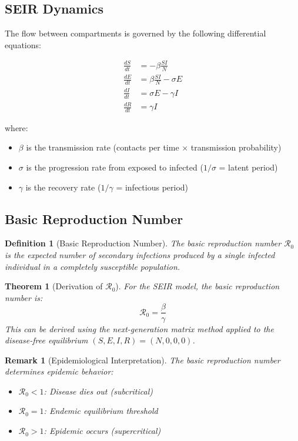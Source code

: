 \documentclass[a4paper, 11pt]{article}
\newtheorem{definition}{Definition}[section]
\newtheorem{theorem}{Theorem}[section]
\newtheorem{remark}{Remark}[section]
\begin{document}
\subsection{SEIR Dynamics}

The flow between compartments is governed by the following differential equations:

\begin{equation}
\begin{aligned}
\frac{dS}{dt} &= -\beta \frac{SI}{N} \\
\frac{dE}{dt} &= \beta \frac{SI}{N} - \sigma E \\
\frac{dI}{dt} &= \sigma E - \gamma I \\
\frac{dR}{dt} &= \gamma I
\end{aligned}
\end{equation}

where:
\begin{itemize}
\item $\beta$ is the transmission rate (contacts per time × transmission probability)
\item $\sigma$ is the progression rate from exposed to infected ($1/\sigma$ = latent period)
\item $\gamma$ is the recovery rate ($1/\gamma$ = infectious period)
\end{itemize}

\subsection{Basic Reproduction Number}

\begin{definition}[Basic Reproduction Number]
The basic reproduction number $\mathcal{R}_0$ is the expected number of secondary infections
produced by a single infected individual in a completely susceptible population.
\end{definition}

\begin{theorem}[Derivation of $\mathcal{R}_0$]
For the SEIR model, the basic reproduction number is:
\begin{equation}
\mathcal{R}_0 = \frac{\beta}{\gamma}
\end{equation}
This can be derived using the next-generation matrix method applied to the disease-free
equilibrium $(S, E, I, R) = (N, 0, 0, 0)$.
\end{theorem}

\begin{remark}[Epidemiological Interpretation]
The basic reproduction number determines epidemic behavior:
\begin{itemize}
\item $\mathcal{R}_0 < 1$: Disease dies out (subcritical)
\item $\mathcal{R}_0 = 1$: Endemic equilibrium threshold
\item $\mathcal{R}_0 > 1$: Epidemic occurs (supercritical)
\end{itemize}
\end{remark}
\end{document}
